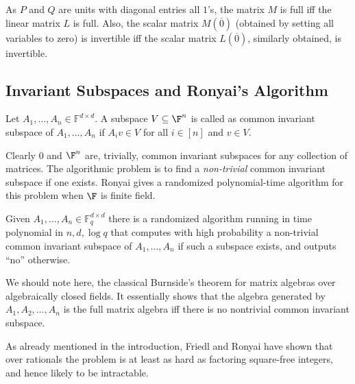 %
%
%
%
%

As $P$ and $Q$ are units with diagonal entries all $1$'s, the matrix
$M$ is full iff the linear matrix $L$ is full. Also, the scalar matrix
$M(\overline{0})$ (obtained by setting all variables to zero) is
invertible iff the scalar matrix $L(\overline{0})$, similarly
obtained, is invertible.\\

\subsection*{Invariant Subspaces and Ronyai's Algorithm}

\begin{definition}
Let $A_1, \ldots, A_n \in \mathbb{F}^{d \times d}$. A subspace
$V\subseteq \F^n$ is called as common invariant subspace of $A_1,
\ldots, A_n$ if $A_i v \in V$ for all $i\in [n]$ and $v\in V$. 
\end{definition}

Clearly $0$ and $\F^n$ are, trivially, common invariant subspaces for
any collection of matrices. The algorithmic problem is to find a
\emph{non-trivial} common invariant subspace if one exists. Ronyai
\cite{Ronyai2} gives a randomized polynomial-time algorithm for this problem
when $\F$ is finite field.

\begin{theorem}\label{thm-ronyai}{\rm\cite{Ronyai2}}
Given $A_1, \ldots, A_n \in \mathbb{F}_q^{d \times d}$ there is a
randomized algorithm running in time polynomial in $n,d, \log q$ that
computes with high probability a non-trivial common invariant subspace
of $A_1, \ldots, A_n$ if such a subspace exists, and outputs ``no''
otherwise.
\end{theorem}
  
\begin{remark}
 We should note here, the classical Burnside's theorem \cite{Bur05} for matrix algebras over algebraically closed fields. It essentially shows that the algebra generated by $A_1, A_2, \ldots, A_n$ is the full matrix algebra iff there is no nontrivial common invariant subspace. \end{remark}  
  
\begin{remark}
    As already mentioned in the introduction, Friedl and Ronyai
  \cite{FR85} have shown that over rationals the problem is at least as
  hard as factoring square-free integers, and hence likely to be
  intractable.
  
\end{remark}  


